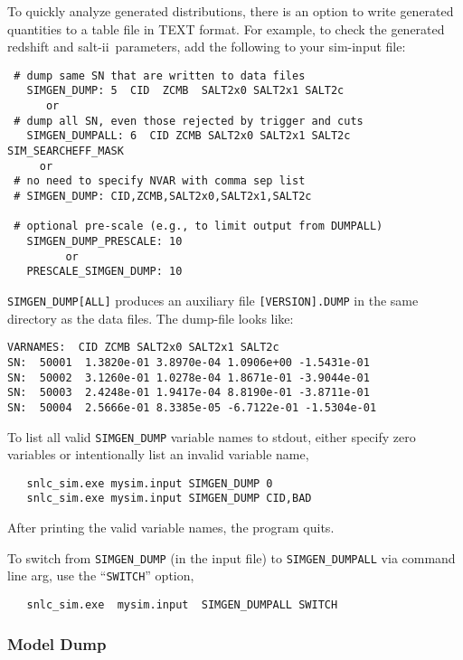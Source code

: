 \documentclass[12pt]{article}
\newcommand{\SALTII}{{\sc salt-ii}}
\begin{document}
To quickly analyze generated distributions,
there is an option to write generated quantities to
a table file in TEXT format.
For example, to check the generated redshift
and \SALTII\ parameters,
add the following to your sim-input file:
%
\begin{verbatim} 
 # dump same SN that are written to data files
   SIMGEN_DUMP: 5  CID  ZCMB  SALT2x0 SALT2x1 SALT2c
      or
 # dump all SN, even those rejected by trigger and cuts
   SIMGEN_DUMPALL: 6  CID ZCMB SALT2x0 SALT2x1 SALT2c SIM_SEARCHEFF_MASK
     or
 # no need to specify NVAR with comma sep list 
 # SIMGEN_DUMP: CID,ZCMB,SALT2x0,SALT2x1,SALT2c
 
 # optional pre-scale (e.g., to limit output from DUMPALL)
   SIMGEN_DUMP_PRESCALE: 10  
         or
   PRESCALE_SIMGEN_DUMP: 10
\end{verbatim}
%
{\tt SIMGEN\_DUMP[ALL]} produces an auxiliary file {\tt [VERSION].DUMP}
in the same directory as the data files.
The dump-file looks like:
%
\begin{Verbatim}[frame=single]
VARNAMES:  CID ZCMB SALT2x0 SALT2x1 SALT2c
SN:  50001  1.3820e-01 3.8970e-04 1.0906e+00 -1.5431e-01
SN:  50002  3.1260e-01 1.0278e-04 1.8671e-01 -3.9044e-01
SN:  50003  2.4248e-01 1.9417e-04 8.8190e-01 -3.8711e-01
SN:  50004  2.5666e-01 8.3385e-05 -6.7122e-01 -1.5304e-01
\end{Verbatim}
%
To list all valid {\tt SIMGEN\_DUMP} variable names to stdout, 
either specify zero variables or 
intentionally list an invalid variable name,
%
\begin{verbatim}
   snlc_sim.exe mysim.input SIMGEN_DUMP 0
   snlc_sim.exe mysim.input SIMGEN_DUMP CID,BAD
\end{verbatim}
%
After printing the valid variable names, the program quits.

To switch  from {\tt SIMGEN\_DUMP} (in the input file) 
to {\tt SIMGEN\_DUMPALL} via command line arg, use the 
``{\tt SWITCH}'' option,
\begin{verbatim}
   snlc_sim.exe  mysim.input  SIMGEN_DUMPALL SWITCH
\end{verbatim}

   \subsubsection{ Model Dump }
   \label{sssec:model_dump}
\end{document}
